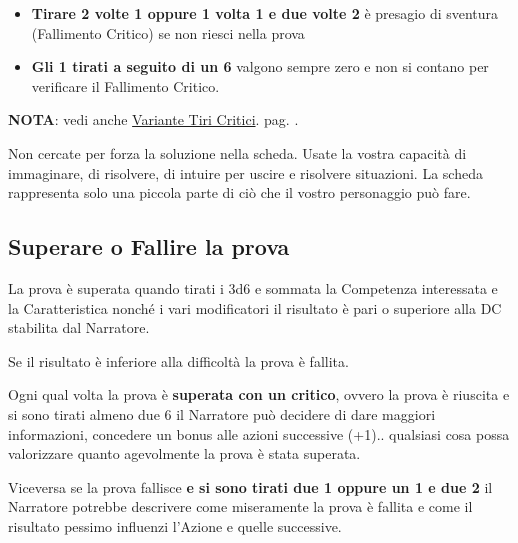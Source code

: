 \begin{multicols}{2}
\begin{itemize}[leftmargin=*]
\item\textbf{Tirare 2 volte 1 oppure 1 volta 1 e due volte 2} è presagio di sventura (Fallimento Critico) se non riesci nella prova 

\item\textbf{Gli 1 tirati a seguito di un 6} valgono sempre zero e non si contano per verificare il Fallimento Critico.

\end{itemize}

\textbf{NOTA}: vedi anche \hyperlink{variantetiricritici}{Variante Tiri Critici}. pag. \pageref{variantetiricritici}.

\begin{changemargin}{0.3cm}{0.3cm}\begin{tcolorbox}[title = Non c'è solo la scheda!]{
Non cercate per forza la soluzione nella scheda. Usate la vostra capacità di immaginare, di risolvere, di intuire per uscire e risolvere situazioni. La scheda rappresenta solo una piccola parte di ciò che il vostro personaggio può fare.
}\end{tcolorbox}\end{changemargin}

\subsection{Superare o Fallire la prova}\label{superareofallirelaprova}

La prova è superata quando tirati i 3d6 e sommata la Competenza interessata e la Caratteristica nonché i vari modificatori il risultato è pari o superiore alla DC stabilita dal Narratore.

Se il risultato è inferiore alla difficoltà la prova è fallita.

Ogni qual volta la prova è \textbf{superata con un critico}, ovvero la prova è riuscita e si sono tirati almeno due 6 il Narratore può decidere di dare maggiori informazioni, concedere un bonus alle azioni successive (+1).. qualsiasi cosa possa valorizzare quanto agevolmente la prova è stata superata.

Viceversa se la prova fallisce \textbf{e si sono tirati due 1 oppure un 1 e due 2} il Narratore potrebbe descrivere come miseramente la prova è fallita e come il risultato pessimo influenzi l'Azione e quelle successive.


\end{multicols}
